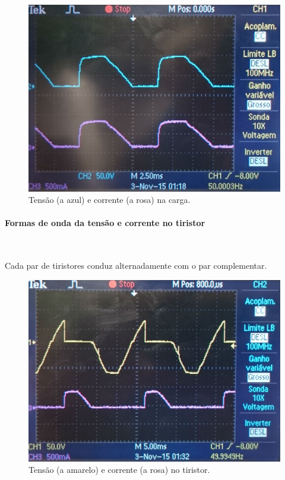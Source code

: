 \documentclass[a4paper,11pt]{article}
\numberwithin{equation}{section}
\begin{document}
\begin{figure}[H]
	\centering
	\includegraphics[keepaspectratio=true, scale=0.13]{img/DSC_0182}
	\caption{Tensão (a azul) e corrente (a rosa) na carga.}
	\label{fig:tccarga}
	\vspace{-0.8em}
\end{figure}

\paragraph{Formas de onda da tensão e corrente no tiristor} \mbox{}\

Cada par de tiristores conduz alternadamente com o par complementar.

\begin{figure}[H]
	\centering
	\includegraphics[keepaspectratio=true, scale=0.13]{img/DSC_0183}
	\caption{Tensão (a amarelo) e corrente (a rosa) no tiristor.}
	\label{fig:tctiristor}
	\vspace{-0.8em}
\end{figure}
\end{document}
